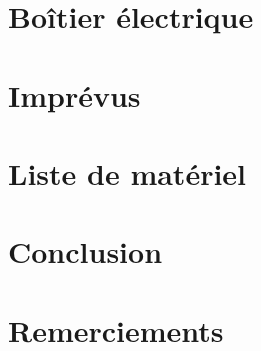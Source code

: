 \documentclass[
    iai, %
    mi, %
]{heig-tb}
\begin{document}
\chapter{Boîtier électrique}


\chapter{Imprévus}


\chapter{Liste de matériel}


\chapter{Conclusion}


\chapter*{Remerciements}


\clearpage
\printbibliography

\label{glossaire}
\printnoidxglossary
\label{index}
\printindex

\appendix
\appendixpage
\addappheadtotoc



\let\cleardoublepage\clearpage
\backmatter


\end{document}
